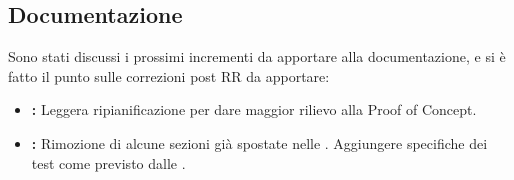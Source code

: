 \documentclass[a4paper, oneside, openany, dvipsnames, table]{article}
\begin{document}
\subsection{Documentazione}
Sono stati discussi i prossimi incrementi da apportare alla documentazione, e si è fatto il punto sulle correzioni post RR da apportare:
\begin{itemize}
	\item \textbf{\PdP: }Leggera ripianificazione per dare maggior rilievo alla Proof of Concept.
	\item \textbf{\PdQ: }Rimozione di alcune sezioni già spostate nelle \NdP. Aggiungere specifiche dei test come previsto dalle \NdP .
\end{itemize}
\end{document}
